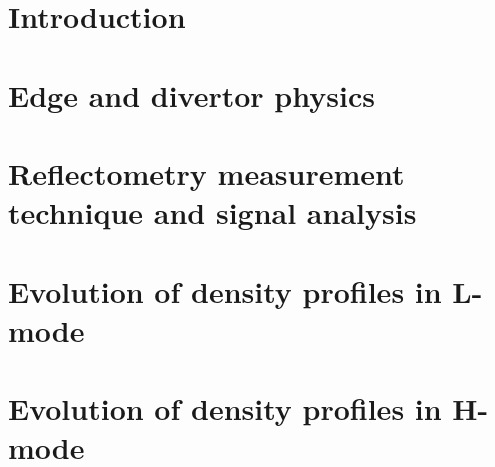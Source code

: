 \documentclass[10pt,a4paper,twoside]{report}
\begin{document}


%
\setcounter{page}{1}

\chapter{Introduction}
\label{chapter:introduction}

\cleardoublepage

\chapter{Edge and divertor physics}
\label{chapter:edgeanddivertorphysics}

\cleardoublepage

\chapter{Reflectometry measurement technique and signal analysis}
\label{chapter:reflectometry}



\cleardoublepage

\chapter{Evolution of density profiles in L-mode}
\label{chapter:lmode}

\cleardoublepage

\chapter{Evolution of density profiles in H-mode}
\label{chapter:hmode}

\cleardoublepage
\end{document}
